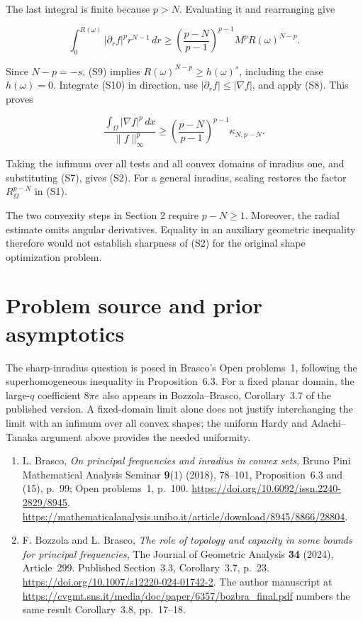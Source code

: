 \documentclass[11pt,a4paper]{article}
\begin{document}
The last integral is finite because \(p>N\). Evaluating it and
rearranging give

\[
\int_0^{R(\omega)}|\partial_r f|^p r^{N-1}\,dr
\geq
\left(\frac{p-N}{p-1}\right)^{p-1}
M^pR(\omega)^{N-p}.
\tag{S10}
\]

Since \(N-p=-s\), (S9) implies \(R(\omega)^{N-p}\geq h(\omega)^s\),
including the case \(h(\omega)=0\). Integrate (S10) in direction, use
\(|\partial_r f|\leq|\nabla f|\), and apply (S8). This proves

\[
\frac{\int_\Omega|\nabla f|^p\,dx}{\|f\|_\infty^p}
\geq
\left(\frac{p-N}{p-1}\right)^{p-1}\kappa_{N,p-N}.
\]

Taking the infimum over all tests and all convex domains of inradius
one, and substituting (S7), gives (S2). For a general inradius, scaling
restores the factor \(R_\Omega^{p-N}\) in (S1).

The two convexity steps in Section 2 require \(p-N\geq1\). Moreover, the
radial estimate omits angular derivatives. Equality in an auxiliary
geometric inequality therefore would not establish sharpness of (S2) for
the original shape optimization problem.

\section{Problem source and prior asymptotics}
The sharp-inradius question is posed in Brasco's Open problems~1,
following the superhomogeneous inequality in Proposition~6.3.
For a fixed planar domain, the large-\(q\) coefficient \(8\pi e\)
also appears in Bozzola--Brasco, Corollary~3.7 of the published version.
A fixed-domain limit alone does not justify interchanging the limit with
an infimum over all convex shapes; the uniform Hardy and
Adachi--Tanaka argument above provides the needed uniformity.
\begin{enumerate}
\raggedright
\item L. Brasco, \emph{On principal frequencies and inradius in convex sets},
Bruno Pini Mathematical Analysis Seminar \textbf{9}(1) (2018), 78--101,
Proposition~6.3 and (15), p.~99; Open problems~1, p.~100.
\url{https://doi.org/10.6092/issn.2240-2829/8945}.
\url{https://mathematicalanalysis.unibo.it/article/download/8945/8866/28804}.
\item F. Bozzola and L. Brasco,
\emph{The role of topology and capacity in some bounds for principal frequencies},
The Journal of Geometric Analysis \textbf{34} (2024), Article~299.
Published Section~3.3, Corollary~3.7, p.~23.
\url{https://doi.org/10.1007/s12220-024-01742-2}.
The author manuscript at
\url{https://cvgmt.sns.it/media/doc/paper/6357/bozbra_final.pdf}
numbers the same result Corollary~3.8, pp.~17--18.
\end{enumerate}
\end{document}
